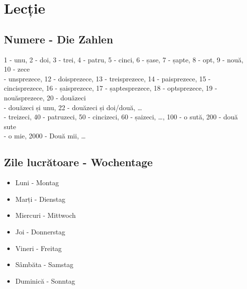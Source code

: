 \documentclass[11pt, oneside]{article}
\begin{document}
\section{Lecție}

\subsection{Numere - Die Zahlen}
1 - unu, 2 - doi, 3 - trei, 4 - patru, 5 - cinci, 6 - șase, 7 - șapte, 8 - opt,
9 - nouă, 10 - zece\\
 - unsprezece, 12 - doisprezece, 13 - treisprezece, 14 - paisprezece, 15 - 
cincisprezece, 16 - șaisprezece, 17 - șaptesprezece, 18 - optsprezece, 19 - 
nouăsprezece, 20 - douăzeci\\
 - douăzeci și unu, 22 - douăzeci și doi/două, \dots\\
 - treizeci, 40 - patruzeci, 50 - cincizeci, 60 - șaizeci, \dots, 100 - o sută, 200 - două sute\\
 - o mie, 2000 - Două mii, \dots
%
\subsection{Zile lucrătoare - Wochentage}
\begin{itemize}
  \item Luni - Montag
  \item Marți - Dienstag
  \item Miercuri - Mittwoch
  \item Joi - Donnerstag
  \item Vineri - Freitag
  \item Sâmbăta - Samstag
  \item Duminică - Sonntag
\end{itemize}
%
\end{document}
